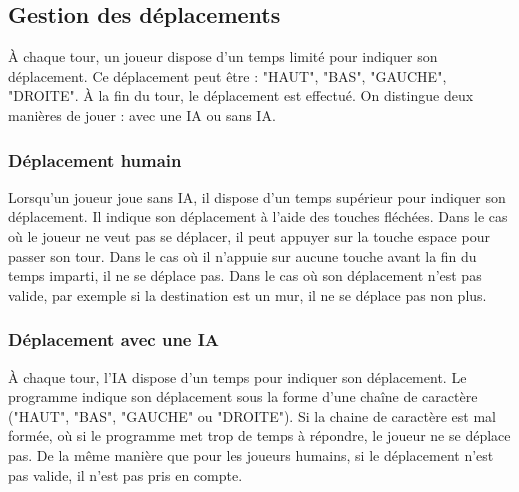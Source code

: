 \subsection{Gestion des déplacements}
À chaque tour, un joueur dispose d'un temps limité pour indiquer son déplacement. Ce déplacement peut être : "HAUT", "BAS", "GAUCHE", "DROITE". À la fin du tour, le déplacement est effectué. On distingue deux manières de jouer : avec une IA ou sans IA.
\subsubsection*{Déplacement humain}
Lorsqu'un joueur joue sans IA, il dispose d'un temps supérieur pour indiquer son déplacement. Il indique son déplacement à l'aide des touches fléchées. Dans le cas où le joueur ne veut pas se déplacer, il peut appuyer sur la touche espace pour passer son tour. Dans le cas où il n'appuie sur aucune touche avant la fin du temps imparti, il ne se déplace pas. Dans le cas où son déplacement n'est pas valide, par exemple si la destination est un mur, il ne se déplace pas non plus.
\subsubsection*{Déplacement avec une IA}
À chaque tour, l'IA dispose d'un temps pour indiquer son déplacement. Le programme indique son déplacement sous la forme d'une chaîne de caractère ("HAUT", "BAS", "GAUCHE" ou "DROITE"). Si la chaine de caractère est mal formée, où si le programme met trop de temps à répondre, le joueur ne se déplace pas. De la même manière que pour les joueurs humains, si le déplacement n'est pas valide, il n'est pas pris en compte.